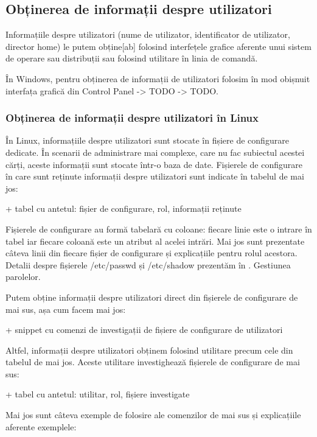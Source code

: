 \subsection{Obținerea de informații despre utilizatori}
\label{sec:users-ops-info}

Informațiile despre utilizatori (nume de utilizator, identificator de
utilizator, director home) le putem obține[ab] folosind interfețele grafice
aferente unui sistem de operare sau distribuții sau folosind utilitare în linia
de comandă.

În Windows, pentru obținerea de informații de utilizatori folosim în mod
obișnuit interfața grafică din Control Panel -> TODO -> TODO.

\subsubsection{Obținerea de informații despre utilizatori în Linux}
\label{sec:users-ops-info-linux}

În Linux, informațiile despre utilizatori sunt stocate în fișiere de configurare
dedicate. În scenarii de administrare mai complexe, care nu fac subiectul
acestei cărți, aceste informații sunt stocate într-o baza de date. Fișierele de
configurare în care sunt reținute informații despre utilizatori sunt indicate în
tabelul de mai jos:

+ tabel cu antetul: fișier de configurare, rol, informații reținute

Fișierele de configurare au formă tabelară cu coloane: fiecare linie este o
intrare în tabel iar fiecare coloană este un atribut al acelei intrări. Mai jos
sunt prezentate câteva linii din fiecare fișier de configurare și explicațiile
pentru rolul acestora. Detalii despre fișierele /etc/passwd și /etc/shadow
prezentăm în . Gestiunea
parolelor.

Putem obține informații despre utilizatori direct din fișierele de configurare
de mai sus, așa cum facem mai jos:

+ snippet cu comenzi de investigații de fișiere de configurare de utilizatori

Altfel, informații despre utilizatori obținem folosind utilitare precum cele din
tabelul de mai jos. Aceste utilitare investighează fișierele de configurare de
mai sus:

+ tabel cu antetul: utilitar, rol, fișiere investigate

Mai jos sunt câteva exemple de folosire ale comenzilor de mai sus și
explicațiile aferente exemplele:

